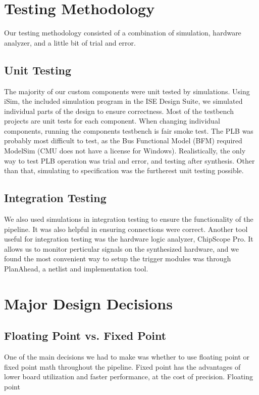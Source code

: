 \documentclass[letterpaper,10pt]{article}
\begin{document}
\section{Testing Methodology}
Our testing methodology consisted of a combination of simulation, hardware analyzer, and a little bit of trial and error.

\subsection{Unit Testing}
The majority of our custom components were unit tested by simulations. Using iSim, the included simulation program in the ISE Design Suite, we simulated individual parts of the design to ensure correctness.  Most of the testbench projects are unit tests for each component.  When changing individual components, running the components testbench is fair smoke test.  The PLB was probably most difficult to test, as the Bus Functional Model (BFM) required ModelSim (CMU does not have a license for Windows).  Realistically, the only way to test PLB operation was trial and error, and testing after synthesis.  Other than that, simulating to specification was the furtherest unit testing possible. 

\subsection{Integration Testing}
We also used simulations in integration testing to ensure the functionality of the pipeline.  It was also helpful in ensuring connections were correct.  Another tool useful for integration testing was the hardware logic analyzer, ChipScope Pro.  It allows us to monitor perticular signals on the synthesized hardware, and we found the most convenient way to setup the trigger modules was through PlanAhead, a netlist and implementation tool.  

\section{Major Design Decisions}
\subsection{Floating Point vs. Fixed Point}
One of the main decisions we had to make was whether to use floating point or fixed point math throughout the pipeline. Fixed point has the advantages of lower board utilization and faster performance, at the cost of precision. Floating point 
\end{document}
